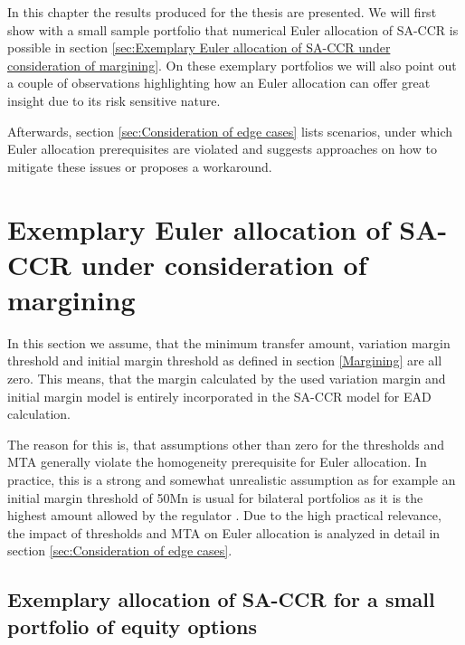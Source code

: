 \documentclass[../Thesis_AHoecherl.tex]{subfiles}
\begin{document}
    In this chapter the results produced for the thesis are presented. We will first show with a small sample portfolio that numerical Euler allocation of \gls{SA-CCR} is possible in section \ref{sec:Exemplary Euler allocation of SA-CCR under consideration of margining}. On these exemplary portfolios we will also point out a couple of observations highlighting how an Euler allocation can offer great insight due to its risk sensitive nature.

    Afterwards, section \ref{sec:Consideration of edge cases} lists scenarios, under which Euler allocation prerequisites are violated and suggests approaches on how to mitigate these issues or proposes a workaround.

    \section{Exemplary Euler allocation of SA-CCR under consideration of margining\label{sec:Exemplary Euler allocation of SA-CCR under consideration of margining}}

    In this section we assume, that the minimum transfer amount, variation margin threshold and initial margin threshold as defined in section \ref{Margining} are all zero. This means, that the margin calculated by the used variation margin and initial margin model is entirely incorporated in the \gls{SA-CCR} model for \gls{EAD} calculation.

    The reason for this is, that assumptions other than zero for the thresholds and \gls{MTA} generally violate the homogeneity prerequisite for Euler allocation. In practice, this is a strong and somewhat unrealistic assumption as for example an initial margin threshold of 50Mn is usual for bilateral portfolios as it is the highest amount allowed by the regulator \cite[Requirement 2.2]{BCBS_MarginRequirements}. Due to the high practical relevance, the impact of thresholds and \gls{MTA} on Euler allocation is analyzed in detail in section \ref{sec:Consideration of edge cases}.   

    \subsection{Exemplary allocation of SA-CCR for a small portfolio of equity options\label{sec:Exemplary allocation of SA-CCR for a small portoflio of equity options}}

\end{document}
